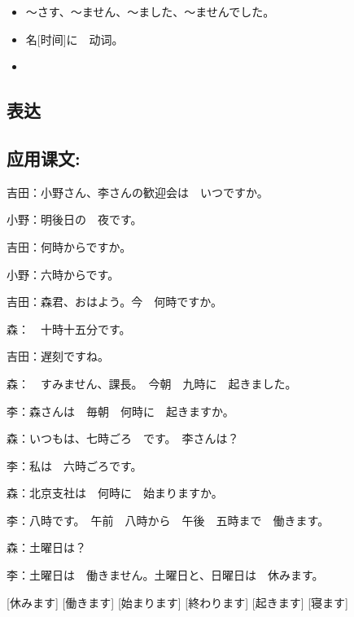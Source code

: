 \begin{itemize}
    \item 〜さす、〜ません、〜ました、〜ませんでした。
    \item 名[时间]に　动词。
    \item 
\end{itemize}


\subsection{表达}


\subsection{应用课文: }

吉田：小野さん、李さんの歓迎会は　いつですか。

小野：明後日の　夜です。

吉田：何時からですか。

小野：六時からです。

\vspace{1em}

吉田：森君、おはよう。今　何時ですか。

森：　十時十五分です。

吉田：遅刻ですね。

森：　すみません、課長。　今朝　九時に　起きました。

\vspace{1em}

李：森さんは　毎朝　何時に　起きますか。

森：いつもは、七時ごろ　です。　李さんは？

李：私は　六時ごろです。

森：北京支社は　何時に　始まりますか。

李：八時です。　午前　八時から　午後　五時まで　働きます。

森：土曜日は？

李：土曜日は　働きません。土曜日と、日曜日は　休みます。

\begin{vocablist}[2]
    [休みます]
    [働きます]
    [始まります]
    [終わります]
    [起きます]
    [寝ます]
\end{vocablist}
